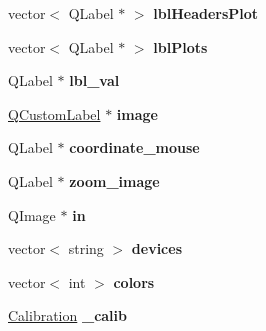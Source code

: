 \begin{DoxyCompactItemize}
\item 
vector$<$ Q\+Label $\ast$ $>$ {\bfseries lbl\+Headers\+Plot}\hypertarget{classMainWindow_a1b39db4ffb71d848273a68ec5e9a9212}{}\label{classMainWindow_a1b39db4ffb71d848273a68ec5e9a9212}

\item 
vector$<$ Q\+Label $\ast$ $>$ {\bfseries lbl\+Plots}\hypertarget{classMainWindow_a69cc5316b71bc5aae325d3dac4db76aa}{}\label{classMainWindow_a69cc5316b71bc5aae325d3dac4db76aa}

\item 
Q\+Label $\ast$ {\bfseries lbl\+\_\+val}\hypertarget{classMainWindow_aabefa899f757a2f4557b6aeb8fe491da}{}\label{classMainWindow_aabefa899f757a2f4557b6aeb8fe491da}

\item 
\hyperlink{classQCustomLabel}{Q\+Custom\+Label} $\ast$ {\bfseries image}\hypertarget{classMainWindow_a2b4e7dadf9705d00ac5266a41e9bda4e}{}\label{classMainWindow_a2b4e7dadf9705d00ac5266a41e9bda4e}

\item 
Q\+Label $\ast$ {\bfseries coordinate\+\_\+mouse}\hypertarget{classMainWindow_af55218a3717b137c673d1a44dfbefa49}{}\label{classMainWindow_af55218a3717b137c673d1a44dfbefa49}

\item 
Q\+Label $\ast$ {\bfseries zoom\+\_\+image}\hypertarget{classMainWindow_a40bac1ed8e340d876c78a76139b0dd61}{}\label{classMainWindow_a40bac1ed8e340d876c78a76139b0dd61}

\item 
Q\+Image $\ast$ {\bfseries in}\hypertarget{classMainWindow_a747d09716ab770596ab6c7da4db422f5}{}\label{classMainWindow_a747d09716ab770596ab6c7da4db422f5}

\item 
vector$<$ string $>$ {\bfseries devices}\hypertarget{classMainWindow_a2b35cc9cc85f624c20c5f77f70f6cac5}{}\label{classMainWindow_a2b35cc9cc85f624c20c5f77f70f6cac5}

\item 
vector$<$ int $>$ {\bfseries colors}\hypertarget{classMainWindow_a50e022a7b906a07cd22deb48b3151740}{}\label{classMainWindow_a50e022a7b906a07cd22deb48b3151740}

\item 
\hyperlink{structcommon_1_1Calibration}{Calibration} {\bfseries \+\_\+calib}\hypertarget{classMainWindow_a759d318080fa015f809ba8ad68313788}{}\label{classMainWindow_a759d318080fa015f809ba8ad68313788}


\end{DoxyCompactItemize}
